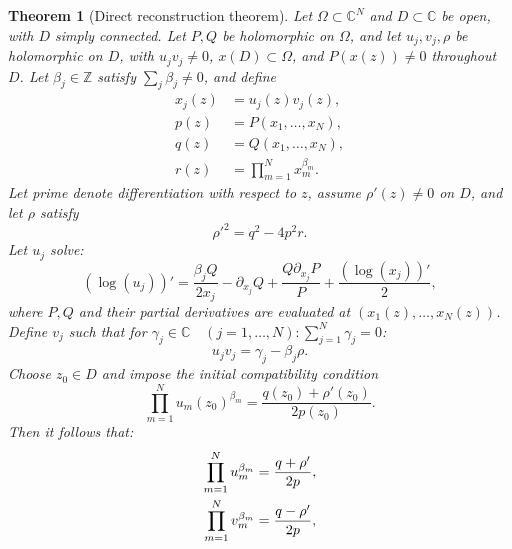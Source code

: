 \documentclass[11pt,a4paper]{article}
\numberwithin{equation}{section}
\newtheorem{theorem}{Theorem}[section]
\begin{document}
\begin{theorem}[Direct reconstruction theorem]
Let $\Omega\subset\mathbb C^N$ and $D\subset\mathbb C$ be open, with $D$ simply connected.
Let $P,Q$ be holomorphic on $\Omega$, and let $u_j,v_j,\rho$ be holomorphic on $D$, with $u_jv_j\ne0$, $x(D)\subset\Omega$, and $P(x(z))\ne0$ throughout $D$.
Let $\beta_j\in\mathbb Z$ satisfy $\sum_j\beta_j\ne0$, and define
\begin{align}
    x_j(z) &= u_j(z) v_j(z), \\
    p(z) &= P\left(x_1,\dots, x_N\right), \\
    q(z) &= Q\left(x_1,\dots, x_N\right), \\
    r(z) &= \prod_{m=1}^{N}x_m^{\beta_m}.
\end{align}
Let prime denote differentiation with respect to $z$, assume $\rho'(z)\ne0$ on $D$, and let $\rho$ satisfy
\begin{equation}
    {\rho'}^2 = q^2 - 4p^2r. \label{eq:theorem-rho-srd}
\end{equation}
Let $u_j$ solve:
\begin{equation}
    \left(\log\left(u_j\right)\right)' = \frac{\beta_j Q}{2 x_j} - \partial_{x_j}Q + \frac{Q \partial_{x_j}P}{P} + \frac{\left(\log\left(x_j\right)\right)'}{2}, \label{eq:theorem-dlog-uj}
\end{equation}
where $P,Q$ and their partial derivatives are evaluated at $(x_1(z),\dots,x_N(z))$. 
Define $v_j$ such that for $\gamma_j \in \mathbb{C} \quad  (j=1,\dots,N): \sum_{j=1}^{N}\gamma_j = 0$:
\begin{equation}
    u_j v_j = \gamma_j - \beta_j \rho. \label{eq:ujvj-rho-theorem}
\end{equation}
Choose $z_0\in D$ and impose the initial compatibility condition
\begin{equation}
    \prod_{m=1}^{N}u_m\left(z_0\right)^{\beta_m} = \frac{q\left(z_0\right) + \rho'\left(z_0\right)}{2 p\left(z_0\right)}. \label{eq:theorem-z0}
\end{equation}
Then it follows that:
\begin{align}
    \prod_{m=1}^{N}u_m^{\beta_m} = \frac{q + \rho'}{2 p}, \notag \\
    \prod_{m=1}^{N}v_m^{\beta_m} = \frac{q - \rho'}{2 p}, \label{eq:u_v-qprho-prods} 
\end{align}

\end{theorem}
\end{document}
